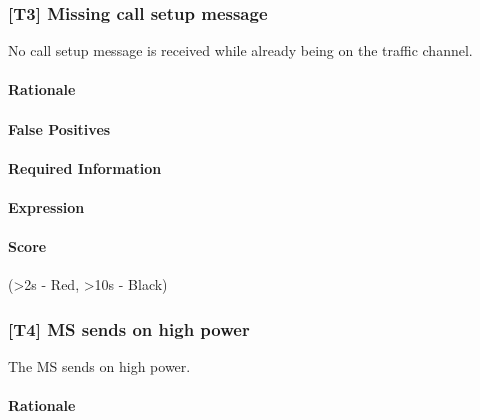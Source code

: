 \documentclass[a4paper,11pt,notitlepage,bigheadings,oneside]{scrartcl}
\begin{document}

\subsubsection{[T3] Missing call setup message}

No call setup message is received while already being on the traffic channel.

\paragraph{Rationale}

\TBD{}

\paragraph{False Positives}

\TBD{}

\paragraph{Required Information}

\TBD{}

\paragraph{Expression}

\TBD{}

\paragraph{Score}

\TBD{} (\textgreater 2s - Red, \textgreater 10s - Black)


\subsubsection{[T4] MS sends on high power}

The MS sends on high power.

\paragraph{Rationale}

\TBD{}
\end{document}
